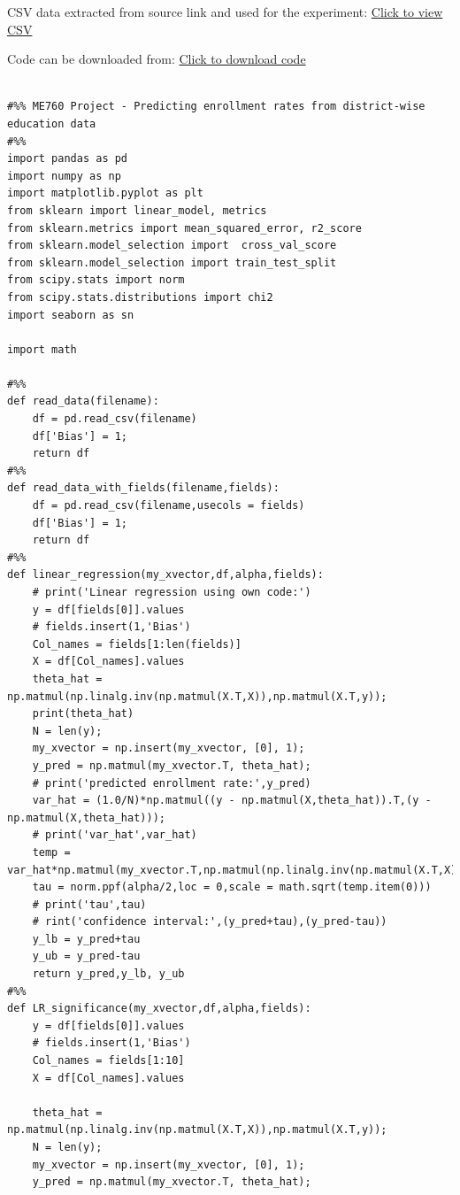\documentclass{article}
\begin{document}
\begin{appendices}
CSV data extracted from source link and used for the experiment: \href{https://uwprod-my.sharepoint.com/:x:/g/personal/ssridhara_wisc_edu/EZXFqgkG02BKhupEidEdMzwBQxlku7ZHe6UGNOKJ_DWt9A?e=89GG2G}{Click to view CSV}

Code can be downloaded from: \href{https://uwprod-my.sharepoint.com/:u:/g/personal/ssridhara_wisc_edu/ERE1fkFjT1tPvzMqik46o1UBbDBkdWNj7p3jxP4TITbzuw?e=UcE0cs}{Click to download code}\\

\begin{lstlisting}

#%% ME760 Project - Predicting enrollment rates from district-wise education data
#%%
import pandas as pd
import numpy as np
import matplotlib.pyplot as plt
from sklearn import linear_model, metrics
from sklearn.metrics import mean_squared_error, r2_score
from sklearn.model_selection import  cross_val_score
from sklearn.model_selection import train_test_split
from scipy.stats import norm
from scipy.stats.distributions import chi2
import seaborn as sn

import math

#%%
def read_data(filename):
    df = pd.read_csv(filename)
    df['Bias'] = 1;
    return df
#%%
def read_data_with_fields(filename,fields):
    df = pd.read_csv(filename,usecols = fields)
    df['Bias'] = 1;
    return df
#%%
def linear_regression(my_xvector,df,alpha,fields):
    # print('Linear regression using own code:')
    y = df[fields[0]].values
    # fields.insert(1,'Bias')
    Col_names = fields[1:len(fields)]   
    X = df[Col_names].values
    theta_hat = np.matmul(np.linalg.inv(np.matmul(X.T,X)),np.matmul(X.T,y));
    print(theta_hat)
    N = len(y);
    my_xvector = np.insert(my_xvector, [0], 1);
    y_pred = np.matmul(my_xvector.T, theta_hat);
    # print('predicted enrollment rate:',y_pred)
    var_hat = (1.0/N)*np.matmul((y - np.matmul(X,theta_hat)).T,(y - np.matmul(X,theta_hat)));
    # print('var_hat',var_hat)
    temp = var_hat*np.matmul(my_xvector.T,np.matmul(np.linalg.inv(np.matmul(X.T,X)),my_xvector));
    tau = norm.ppf(alpha/2,loc = 0,scale = math.sqrt(temp.item(0)))
    # print('tau',tau)
    # rint('confidence interval:',(y_pred+tau),(y_pred-tau))
    y_lb = y_pred+tau
    y_ub = y_pred-tau
    return y_pred,y_lb, y_ub
#%%
def LR_significance(my_xvector,df,alpha,fields):
    y = df[fields[0]].values
    # fields.insert(1,'Bias')
    Col_names = fields[1:10]   
    X = df[Col_names].values

    theta_hat = np.matmul(np.linalg.inv(np.matmul(X.T,X)),np.matmul(X.T,y));
    N = len(y);
    my_xvector = np.insert(my_xvector, [0], 1);
    y_pred = np.matmul(my_xvector.T, theta_hat);


\end{lstlisting}
\end{appendices}
\end{document}
